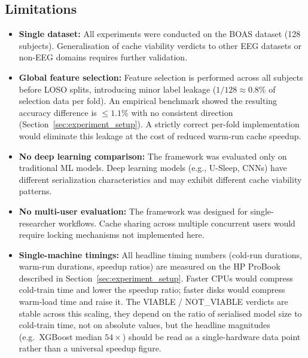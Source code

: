 \subsection{Limitations}
\label{sec:limitations}

\begin{itemize}
\item \textbf{Single dataset:} All experiments were conducted on the BOAS
 dataset (128 subjects). Generalisation of cache viability verdicts to
 other EEG datasets or non-EEG domains requires further validation.

\item \textbf{Global feature selection:} Feature selection is performed across
 all subjects before LOSO splits, introducing minor label leakage
 ($1/128 \approx 0.8\%$ of selection data per fold). An empirical benchmark
 showed the resulting accuracy difference is $\leq 1.1\%$ with no
 consistent direction (Section~\ref{sec:experiment_setup}). A strictly
 correct per-fold implementation would eliminate this leakage at the cost
 of reduced warm-run cache speedup.

\item \textbf{No deep learning comparison:} The framework was evaluated only
 on traditional ML models. Deep learning models (e.g., U-Sleep, CNNs)
 have different serialization characteristics and may exhibit different
 cache viability patterns.

\item \textbf{No multi-user evaluation:} The framework was designed for
 single-researcher workflows. Cache sharing across multiple concurrent
 users would require locking mechanisms not implemented here.

\item \textbf{Single-machine timings:} All headline timing numbers
 (cold-run durations, warm-run durations, speedup ratios) are
 measured on the HP ProBook described in
 Section~\ref{sec:experiment_setup}. Faster CPUs would compress
 cold-train time and lower the speedup ratio; faster disks would
 compress warm-load time and raise it. The VIABLE / NOT\_VIABLE
 verdicts are stable across this scaling, they depend on the
 ratio of serialised model size to cold-train time, not on absolute
 values, but the headline magnitudes (e.g.\ XGBoost median
 $54\times$) should be read as a single-hardware data point rather
 than a universal speedup figure.


\end{itemize}
